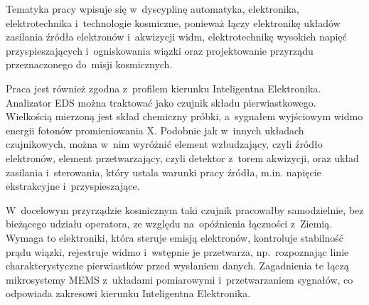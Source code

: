 Tematyka pracy wpisuje się w~dyscyplinę automatyka, elektronika,
elektrotechnika i~technologie kosmiczne, ponieważ łączy elektronikę
układów zasilania źródła elektronów i~akwizycji widm, elektrotechnikę
wysokich napięć przyspieszających i~ogniskowania wiązki oraz
projektowanie przyrządu przeznaczonego do~misji kosmicznych.

Praca jest również zgodna z~profilem kierunku Inteligentna Elektronika.
Analizator EDS można traktować jako czujnik składu pierwiastkowego.
Wielkością mierzoną jest skład chemiczny próbki, a~sygnałem wyjściowym
widmo energii fotonów promieniowania X. Podobnie jak w~innych układach
czujnikowych, można w~nim wyróżnić element wzbudzający, czyli źródło
elektronów, element przetwarzający, czyli detektor z~torem akwizycji,
oraz układ zasilania i~sterowania, który ustala warunki pracy źródła,
m.in. napięcie ekstrakcyjne i~przyspieszające.

W~docelowym przyrządzie kosmicznym taki czujnik pracowałby samodzielnie,
bez bieżącego udziału operatora, ze względu na~opóźnienia łączności
z~Ziemią. Wymaga to elektroniki, która steruje emisją elektronów,
kontroluje stabilność prądu wiązki, rejestruje widmo i~wstępnie je
przetwarza, np.~rozpoznając linie charakterystyczne pierwiastków przed
wysłaniem danych. Zagadnienia te łączą mikrosystemy MEMS z~układami
pomiarowymi i~przetwarzaniem sygnałów, co odpowiada zakresowi kierunku
Inteligentna Elektronika.

